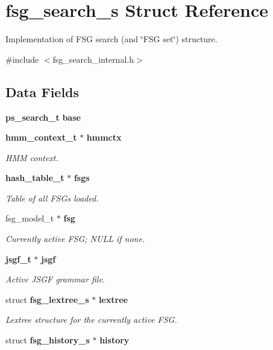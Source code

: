 \section{fsg\-\_\-search\-\_\-s \-Struct \-Reference}
\label{structfsg__search__s}


\-Implementation of \-F\-S\-G search (and \char`\"{}\-F\-S\-G set\char`\"{}) structure.  




{\ttfamily \#include $<$fsg\-\_\-search\-\_\-internal.\-h$>$}

\subsection*{\-Data \-Fields}
\begin{DoxyCompactItemize}
\item 
{\bf ps\-\_\-search\-\_\-t} {\bfseries base}\label{structfsg__search__s_a75f0e3fd5396d62616b9f84eab7ea355}

\item 
{\bf hmm\-\_\-context\-\_\-t} $\ast$ {\bf hmmctx}
\begin{DoxyCompactList}\small\item\em \-H\-M\-M context. \end{DoxyCompactList}\item 
{\bf hash\-\_\-table\-\_\-t} $\ast$ {\bf fsgs}\label{structfsg__search__s_a3d31a88c719aaf36ecae5c96ecddbd73}

\begin{DoxyCompactList}\small\item\em \-Table of all \-F\-S\-Gs loaded. \end{DoxyCompactList}\item 
fsg\-\_\-model\-\_\-t $\ast$ {\bf fsg}
\begin{DoxyCompactList}\small\item\em \-Currently active \-F\-S\-G; \-N\-U\-L\-L if none. \end{DoxyCompactList}\item 
{\bf jsgf\-\_\-t} $\ast$ {\bf jsgf}
\begin{DoxyCompactList}\small\item\em \-Active \-J\-S\-G\-F grammar file. \end{DoxyCompactList}\item 
struct {\bf fsg\-\_\-lextree\-\_\-s} $\ast$ {\bf lextree}\label{structfsg__search__s_ac2c756ff6c1a2f1059011756d22441f8}

\begin{DoxyCompactList}\small\item\em \-Lextree structure for the currently active \-F\-S\-G. \end{DoxyCompactList}\item 
struct {\bf fsg\-\_\-history\-\_\-s} $\ast$ {\bf history}\label{structfsg__search__s_abc949ccaab380bcf5b452d1cac54469b}


\end{DoxyCompactItemize}
